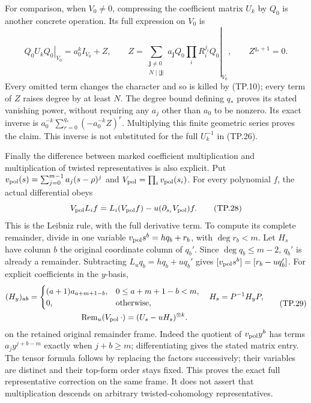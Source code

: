 For comparison, when \(V_0\ne0\), compressing the coefficient matrix
\(U_k\) by \(Q_0\) is another concrete operation. Its
full expression on \(V_0\) is
\[
 \left.Q_0U_kQ_0\right|_{V_0}
  =a_0^k I_{V_0}+Z,\qquad
 Z=\left.\sum_{\substack{\mathbf j\ne0\\N\mid|\mathbf j|}}
       a_{\mathbf j}Q_0\prod_iR_i^{j_i}Q_0\right|_{V_0},
 \qquad Z^{q_*+1}=0.
 \tag{TP.27}\label{CFStage:eq:tp-unitcompression}
\]
Every omitted term changes the character and so is
killed by (TP.10); every term of \(Z\) raises degree
by at least \(N\). The degree bound defining \(q_*\)
proves its stated vanishing power, without requiring
any \(a_j\) other than \(a_0\) to be nonzero.
Its exact inverse is
\(a_0^{-k}\sum_{r=0}^{q_*}(-a_0^{-k}Z)^r\).
Multiplying this finite geometric series proves the
claim. This inverse is not substituted for the full
\(U_k^{-1}\) in (TP.26).

Finally the difference between marked coefficient
multiplication and multiplication of twisted representatives
is also explicit. Put
\(v_{\rm pol}(s)=\sum_{j=0}^{m-1}a_j(s-\rho)^j\)
and \(V_{\rm pol}=\prod_i v_{\rm pol}(s_i)\).
For every polynomial \(f\), the actual differential obeys
\[
 V_{\rm pol}L_if=L_i(V_{\rm pol}f)
                    -u(\partial_{s_i}V_{\rm pol})f.
 \tag{TP.28}\label{CFStage:eq:tp-unitdefect}
\]
This is the Leibniz rule, with the full derivative term.
To compute its complete remainder, divide in one variable
\(v_{\rm pol}s^b=hq_b+r_b\), with \(\deg r_b<m\).
Let \(H_s\) have column \(b\) the original coordinate
column of \(q_b'\). Since \(\deg q_b\leq m-2\),
\(q_b'\) is already a remainder. Subtracting
\(L_uq_b=hq_b+uq_b'\) gives
\([v_{\rm pol}s^b]=[r_b-uq_b']\).
For explicit coefficients in the \(y\)-basis,
\[
 \begin{gathered}
 (H_y)_{ab}=
 \begin{cases}
 (a+1)a_{a+m+1-b},&0\leq a+m+1-b<m,\\
 0,&\hbox{otherwise},
 \end{cases}
 \quad H_s=P^{-1}H_yP,\\
 \operatorname{Rem}_u(V_{\rm pol}\,\cdot)
           =(U_s-uH_s)^{\otimes k}.
 \end{gathered}
 \tag{TP.29}\label{CFStage:eq:tp-unitremainder}
\]
on the retained original remainder frame. Indeed the
quotient of \(v_{\rm pol}y^b\) has terms
\(a_jy^{j+b-m}\) exactly when \(j+b\geq m\);
differentiating gives the stated matrix entry.
The tensor formula follows by replacing the factors
successively; their variables are distinct and their
top-form order stays fixed. This proves the exact full
representative correction on the same frame. It does
not assert that multiplication descends on arbitrary
twisted-cohomology representatives.

